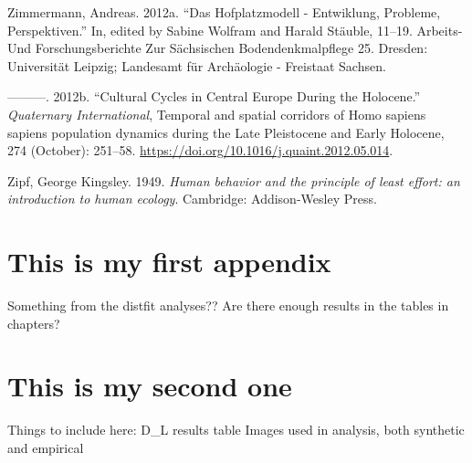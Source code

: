 \documentclass[
  12pt,
  a4paper, twoside]{book}
\newlength{\cslhangindent}
\newlength{\cslentryspacingunit} %
\newenvironment{CSLReferences}[2] %
 {%
  \setlength{\parindent}{0pt}
  \ifodd #1
  \let\oldpar\par
  \def\par{\hangindent=\cslhangindent\oldpar}
  \fi
  \setlength{\parskip}{#2\cslentryspacingunit}
 }%
 {}
\begin{document}
\begin{CSLReferences}{1}{0}
\leavevmode{}%
Zimmermann, Andreas. 2012a. {``Das Hofplatzmodell - Entwiklung, Probleme, Perspektiven.''} In, edited by Sabine Wolfram and Harald Stäuble, 11--19. Arbeits- Und Forschungsberichte Zur Sächsischen Bodendenkmalpflege 25. Dresden: Universität Leipzig; Landesamt für Archäologie - Freistaat Sachsen.

\leavevmode{}%
---------. 2012b. {``Cultural Cycles in {Central Europe} During the {Holocene}.''} \emph{Quaternary International}, Temporal and spatial corridors of {Homo} sapiens sapiens population dynamics during the {Late Pleistocene} and {Early Holocene}, 274 (October): 251--58. \url{https://doi.org/10.1016/j.quaint.2012.05.014}.

\leavevmode{}%
Zipf, George Kingsley. 1949. \emph{Human behavior and the principle of least effort: an introduction to human ecology}. Cambridge: Addison-Wesley Press.

\end{CSLReferences}

\hypertarget{appendix-appendix}{%
\appendix {}}


\hypertarget{this-is-my-first-appendix}{%
\chapter{This is my first appendix}\label{this-is-my-first-appendix}}

Something from the distfit analyses??
Are there enough results in the tables in chapters?

\hypertarget{this-is-my-second-one}{%
\chapter{This is my second one}\label{this-is-my-second-one}}

Things to include here:
D\_L results table
Images used in analysis, both synthetic and empirical
\end{document}
